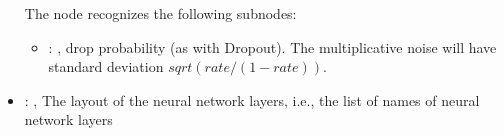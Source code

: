 \begin{itemize}
      The  node recognizes the following subnodes:
      \begin{itemize}
        \item {}: , 
          drop probability (as with Dropout). The multiplicative noise will have standard deviation
          $sqrt(rate / (1 - rate))$.
      \end{itemize}

    \item {}: , 
      The layout of the neural network layers, i.e., the list of names of neural network layers
  \end{itemize}
